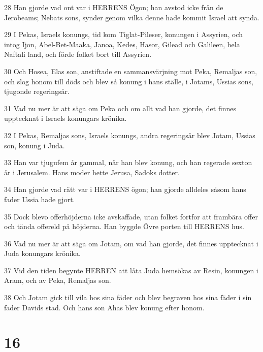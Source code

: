 \par 28 Han gjorde vad ont var i HERRENS Ögon; han avstod icke från de Jerobeams; Nebats sons, synder genom vilka denne hade kommit Israel att synda.
\par 29 I Pekas, Israels konungs, tid kom Tiglat-Pileser, konungen i Assyrien, och intog Ijon, Abel-Bet-Maaka, Janoa, Kedes, Hasor, Gilead och Galileen, hela Naftali land, och förde folket bort till Assyrien.
\par 30 Och Hosea, Elas son, anstiftade en sammansvärjning mot Peka, Remaljas son, och slog honom till döds och blev så konung i hans ställe, i Jotams, Ussias sons, tjugonde regeringsår.
\par 31 Vad nu mer är att säga om Peka och om allt vad han gjorde, det finnes upptecknat i Israels konungars krönika.
\par 32 I Pekas, Remaljas sons, Israels konungs, andra regeringsår blev Jotam, Ussias son, konung i Juda.
\par 33 Han var tjugufem år gammal, när han blev konung, och han regerade sexton år i Jerusalem. Hans moder hette Jerusa, Sadoks dotter.
\par 34 Han gjorde vad rätt var i HERRENS ögon; han gjorde alldeles såsom hans fader Ussia hade gjort.
\par 35 Dock blevo offerhöjderna icke avskaffade, utan folket fortfor att frambära offer och tända offereld på höjderna. Han byggde Övre porten till HERRENS hus.
\par 36 Vad nu mer är att säga om Jotam, om vad han gjorde, det finnes upptecknat i Juda konungars krönika.
\par 37 Vid den tiden begynte HERREN att låta Juda hemsökas av Resin, konungen i Aram, och av Peka, Remaljas son.
\par 38 Och Jotam gick till vila hos sina fäder och blev begraven hos sina fäder i sin fader Davids stad. Och hans son Ahas blev konung efter honom.

\chapter{16}

